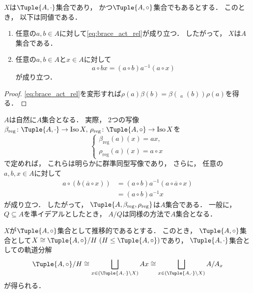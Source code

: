 \documentclass{jlreq}
\newcommand{\CompReps}[1]{\left(#1\right)}
\DeclareMathOperator{\LambdaMapOp}{\lambda^{\mathrm{op}}}
\DeclareMathOperator{\Iso}{Iso}
\begin{document}
	\begin{proposition}
		$X$は$\Tuple{A, \cdot}$集合であり，
		かつ$\Tuple{A, \circ}$集合でもあるとする．
		このとき，
		以下は同値である．
		\begin{enumerate}
			\item 任意の$a, b \in A$に対して\cref{eq:brace_act_rel}が成り立つ．
			したがって，
			$X$は$A$集合である．
			\item 任意の$a, b \in A$と$x \in A$に対して
			\begin{equation}\label{eq:act_brace_rel}
				a \circ bx
				= (a \circ b) a^{-1} (a \circ x)
			\end{equation}
			が成り立つ．
		\end{enumerate}
	\end{proposition}
	
	\begin{proof}
		\cref{eq:brace_act_rel}を変形すれば$\rho(a)\beta(b) = \beta(\LambdaMapOp_a(b))\rho(a)$を得る．
	\end{proof}

	$A$は自然に$A$集合となる．
	実際，
	2つの写像$\beta_{\mathrm{reg}} \colon \Tuple{A, \cdot} \to \Iso X,\, \rho_{\mathrm{reg}} \colon \Tuple{A, \circ} \to \Iso X$を
	\begin{equation}
		\begin{cases}
			\beta_{\mathrm{reg}}(a)(x) = ax, \\
			\rho_{\mathrm{reg}}(a)(x) = a \circ x
		\end{cases}
	\end{equation}
	で定めれば，
	これらは明らかに群準同型写像であり，
	さらに，
	任意の$a, b, x \in A$に対して
	\begin{align}
		a \circ (b (\overline{a} \circ x))
		&= (a \circ b) a^{-1} (a \circ \overline{a} \circ x) \\
		&= (a \circ b) a^{-1} x
	\end{align}
	が成り立つ．
	したがって，
	$\Tuple{A, \beta_{\mathrm{reg}}, \rho_{\mathrm{reg}}}$は$A$集合である．
	一般に，
	$Q \subseteq A$を準イデアルとしたとき，
	$A/Q$は同様の方法で$A$集合となる．
	
	$X$が$\Tuple{A, \circ}$集合として推移的であるとする．
	このとき，
	$\Tuple{A, \circ}$集合として$X \cong \Tuple{A, \circ}/H\ (H \le \Tuple{A, \circ})$であり，
	$\Tuple{A, \cdot}$集合としての軌道分解
	\begin{equation}
		\Tuple{A, \circ}/H \cong \bigsqcup_{x \in \CompReps{\Tuple{A, \cdot} \backslash X}} Ax
		\cong \bigsqcup_{x \in \CompReps{\Tuple{A, \cdot} \backslash X}} A/A_x
	\end{equation}
	が得られる．
	
\end{document}
